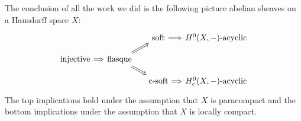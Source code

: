 The conclusion of all the work we did is the following picture abelian sheaves on a Hausdorff space \(X\):
\begin{equation*}
  \begin{tikzcd}[arrows=Rightarrow, column sep=small, row sep=small]
    & & \textup{soft} \ar[r] & \textup{\(H^0(X,-)\)-acyclic} \\
    \textup{injective} \ar[r] & \textup{flasque} \ar[ru] \ar[rd] \\
    & & \textup{c-soft} \ar[r] & \textup{\(H^0_c(X,-)\)-acyclic}
  \end{tikzcd}
\end{equation*}
The top implications hold under the assumption that \(X\) is paracompact and the bottom implications under the assumption that \(X\) is locally compact.

